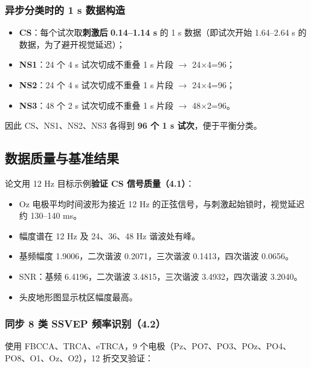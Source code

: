\documentclass[12pt, a4paper]{ctexart}
\begin{document}
\subsubsection*{异步分类时的 1 s 数据构造}

\begin{itemize}
  \item \textbf{CS}：每个试次取\textbf{刺激后} \textbf{0.14--1.14 s} 的 1 s 数据（即试次开始 1.64--2.64 s 的数据，为了避开视觉延迟）；
  \item \textbf{NS1}：24 个 4 s 试次切成不重叠 1 s 片段 $\rightarrow$ 24$\times$4=96；
  \item \textbf{NS2}：24 个 4 s 试次切成不重叠 1 s 片段 $\rightarrow$ 24$\times$4=96；
  \item \textbf{NS3}：48 个 2 s 试次切成不重叠 1 s 片段 $\rightarrow$ 48$\times$2=96。
\end{itemize}

因此 CS、NS1、NS2、NS3 各得到 \textbf{96 个 1 s 试次}，便于平衡分类。

\subsection{数据质量与基准结果}

论文用 12 Hz 目标示例\textbf{验证 CS 信号质量（4.1）}：

\begin{itemize}
  \item Oz 电极平均时间波形为接近 12 Hz 的正弦信号，与刺激起始锁时，视觉延迟约 130--140 ms。
  \item 幅度谱在 12 Hz 及 24、36、48 Hz 谐波处有峰。
  \item 基频幅度 1.9006，二次谐波 0.2071，三次谐波 0.1413，四次谐波 0.0656。
  \item SNR：基频 6.4196，二次谐波 3.4815，三次谐波 3.4932，四次谐波 3.2040。
  \item 头皮地形图显示枕区幅度最高。
\end{itemize}

\subsubsection*{同步 8 类 SSVEP 频率识别（4.2）}

使用 FBCCA、TRCA、eTRCA，9 个电极（Pz、PO7、PO3、POz、PO4、PO8、O1、Oz、O2），12 折交叉验证：
\end{document}

